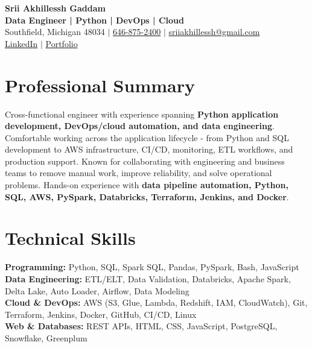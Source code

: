 \documentclass[letterpaper,10pt]{article}
\begin{document}
\fontsize{9.35pt}{10.45pt}\selectfont

\begin{center}
    {\LARGE \textbf{Srii Akhillessh Gaddam}} \\[-1pt]
    \textbf{Data Engineer | Python | DevOps | Cloud} \\[2pt]
    Southfield, Michigan 48034 $|$
    \href{tel:6468752400}{646-875-2400} $|$
    \href{mailto:sriiakhillessh@gmail.com}{sriiakhillessh@gmail.com} \\[1pt]
    \href{https://www.linkedin.com/in/srii-akhiilessh-gaddam-b48668191/}{LinkedIn} $|$
    \href{https://sriiakhillesshg.github.io/portfolio/}{Portfolio}
\end{center}
\vspace{-8pt}

\section{Professional Summary}
\small{Cross-functional engineer with experience spanning \textbf{Python application development, DevOps/cloud automation, and data engineering}. Comfortable working across the application lifecycle - from Python and SQL development to AWS infrastructure, CI/CD, monitoring, ETL workflows, and production support. Known for collaborating with engineering and business teams to remove manual work, improve reliability, and solve operational problems. Hands-on experience with \textbf{data pipeline automation, Python, SQL, AWS, PySpark, Databricks, Terraform, Jenkins, and Docker}.}

\section{Technical Skills}
\small{
\textbf{Programming:} Python, SQL, Spark SQL, Pandas, PySpark, Bash, JavaScript \\
\textbf{Data Engineering:} ETL/ELT, Data Validation, Databricks, Apache Spark, Delta Lake, Auto Loader, Airflow, Data Modeling \\
\textbf{Cloud \& DevOps:} AWS (S3, Glue, Lambda, Redshift, IAM, CloudWatch), Git, Terraform, Jenkins, Docker, GitHub, CI/CD, Linux \\
\textbf{Web \& Databases:} REST APIs, HTML, CSS, JavaScript, PostgreSQL, Snowflake, Greenplum
}

\end{document}
